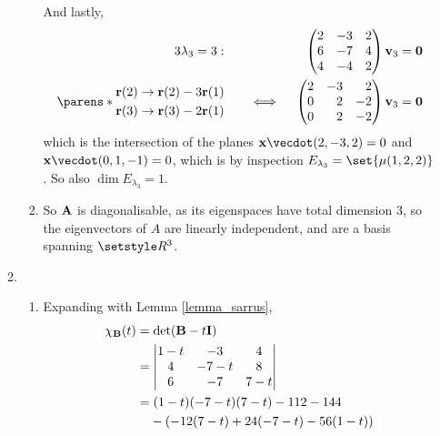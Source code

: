 \documentclass[fleqn,a4paper,11pt]{article}
\begin{document}
\begin{enumerate}[label=\textbf{\arabic*.}]
\begin{enumerate}[label=(\textbf{\Alph*})]
\begin{enumerate}[label=(\roman*)]
       And lastly,
       \begin{alignat*}3
        \lambda_3 = 3:\quad&&
        &&\begin{pmatrix}
         2 & -3 & 2 \\
         6 & -7 & 4 \\
         4 & -4 & 2
        \end{pmatrix}
        \vec v_3 &= \vec 0 \\
        \parens*{
         \begin{aligned}
          \vec r(2) &\to \vec r(2) - 3 \vec r(1) \\
          \vec r(3) &\to \vec r(3) - 2 \vec r(1)
         \end{aligned}
        } \quad
        &&\iff{}&&\begin{pmatrix*}[r]
         2 & -3 & 2 \\
         0 & 2 & -2 \\
         0 & 2 & -2
        \end{pmatrix*}
        \vec v_3 &= \vec 0
       \end{alignat*}
       which is the intersection of the planes
       \(\vec x \vecdot (2, -3, 2) = 0\) and
       \(\vec x \vecdot (0, 1, -1) = 0\), which is by inspection
       \(E_{\lambda_3} = \set{\mu(1, 2, 2)}\). So also
       \(\dim E_{\lambda_3} = 1\).
      \item
       So \(\mathbf{A}\) is diagonalisable, as its eigenspaces have total dimension
       \(3\), so the eigenvectors of \(A\) are linearly independent, and are a
       basis spanning \(\Reals^3\).
     \end{enumerate}
    \item
     \begin{enumerate}[label=(\roman*)]
      \item Expanding with Lemma \ref{lemma_sarrus},
       \begin{align*}
        \chi_{\mat B}(t)
         &= \det(\mat B - t\mat I) \\
         &= \begin{vmatrix}
          1 - t & -3 & 4 \\
          4 & -7 - t & 8 \\
          6 & -7 & 7 - t
         \end{vmatrix} \\
         &= (1 - t)(-7 - t)(7 - t) - 112 - 144 \\
         &\phantom{={}} - (-12(7 - t) + 24(-7 - t) - 56(1 - t)) \\

\end{align*}
\end{enumerate}
\end{enumerate}
\end{enumerate}
\end{document}
